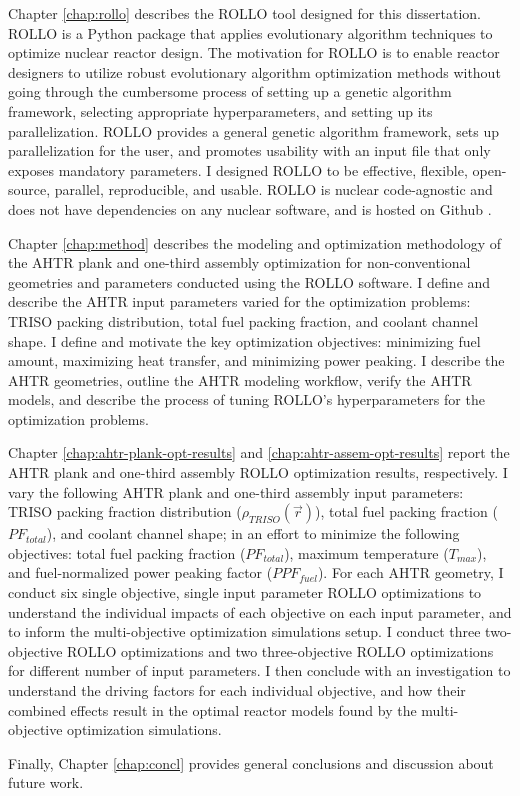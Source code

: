 Chapter \ref{chap:rollo} describes the \acrfull{ROLLO} tool designed for this 
dissertation. 
\gls{ROLLO} is a Python package that applies evolutionary algorithm 
techniques to optimize nuclear reactor design. 
The motivation for \gls{ROLLO} is to enable reactor designers to utilize 
robust evolutionary algorithm optimization methods without going 
through the cumbersome process of setting up a genetic algorithm framework,
selecting appropriate hyperparameters, and setting up its parallelization. 
\gls{ROLLO} provides a general genetic algorithm framework, sets up 
parallelization for the user, and promotes usability with an input file 
that only exposes mandatory parameters.
I designed  \gls{ROLLO} to be effective, flexible, open-source, parallel, 
reproducible, and usable. 
\gls{ROLLO} is nuclear code-agnostic and does not have dependencies on any 
nuclear software, and is hosted on Github \cite{chee_rollo_2021}. 

Chapter \ref{chap:method} describes the modeling and optimization methodology of the 
\gls{AHTR} plank and one-third assembly optimization for non-conventional 
geometries and parameters conducted using the \gls{ROLLO} software.
I define and describe the \gls{AHTR} input parameters varied for the optimization 
problems: \gls{TRISO} packing distribution, total fuel packing fraction, and 
coolant channel shape.
I define and motivate the key optimization objectives: minimizing fuel amount,
maximizing heat transfer, and minimizing power peaking.
I describe the \gls{AHTR} geometries, outline the \gls{AHTR} modeling workflow, 
verify the \gls{AHTR} models, and describe the process of tuning \gls{ROLLO}'s 
hyperparameters for the optimization problems.

Chapter \ref{chap:ahtr-plank-opt-results} and \ref{chap:ahtr-assem-opt-results} 
report the \gls{AHTR} plank and one-third assembly \gls{ROLLO} optimization results, 
respectively. 
I vary the following \gls{AHTR} plank and one-third assembly input parameters: 
\gls{TRISO} packing fraction distribution ($\rho_{TRISO}(\vec{r})$), total fuel 
packing fraction ($PF_{total}$), and coolant channel shape; in an effort to minimize 
the following objectives: total fuel packing fraction ($PF_{total}$), maximum 
temperature ($T_{max}$), and fuel-normalized power peaking factor ($PPF_{fuel}$). 
For each \gls{AHTR} geometry, I conduct six single objective, single input parameter 
\gls{ROLLO} optimizations to understand the individual impacts of each objective on 
each input parameter, and to inform the multi-objective optimization simulations setup. 
I conduct three two-objective \gls{ROLLO} optimizations and two three-objective 
\gls{ROLLO} optimizations for different number of input parameters. 
I then conclude with an investigation to understand the driving factors for each 
individual objective, and how their combined effects result in the optimal reactor 
models found by the multi-objective optimization simulations. 

Finally, Chapter \ref{chap:concl} provides general conclusions and discussion about 
future work. 